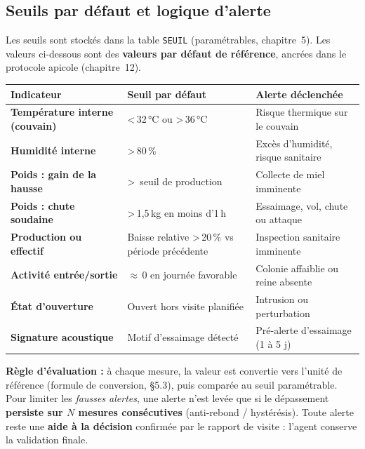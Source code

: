 \subsection{Seuils par défaut et logique d'alerte}
Les seuils sont stockés dans la table \texttt{SEUIL} (paramétrables, chapitre~5).
Les valeurs ci-dessous sont des \textbf{valeurs par défaut de référence}, ancrées
dans le protocole apicole (chapitre~12).
\begin{xltabular}{\textwidth}{>{\bfseries}p{4.4cm} X p{4.4cm}}
\toprule
\textbf{Indicateur} & \textbf{Seuil par défaut} & \textbf{Alerte déclenchée} \\
\midrule
\endhead
Température interne (couvain) & \textless\,32\,°C ou \textgreater\,36\,°C & Risque thermique sur le couvain \\
Humidité interne & \textgreater\,80\,\% & Excès d'humidité, risque sanitaire \\
Poids : gain de la hausse & \textgreater\ seuil de production & Collecte de miel imminente \\
Poids : chute soudaine & \textgreater\,1,5\,kg en moins d'1\,h & Essaimage, vol, chute ou attaque \\
Production ou effectif & Baisse relative \textgreater\,20\,\% vs période précédente & Inspection sanitaire imminente \\
Activité entrée/sortie & $\approx$\,0 en journée favorable & Colonie affaiblie ou reine absente \\
État d'ouverture & Ouvert hors visite planifiée & Intrusion ou perturbation \\
Signature acoustique & Motif d'essaimage détecté & Pré-alerte d'essaimage (1 à 5 j) \\
\bottomrule
\end{xltabular}
\begin{encadre}
\textbf{Règle d'évaluation :} à chaque mesure, la valeur est convertie vers
l'unité de référence (formule de conversion, §5.3), puis comparée au seuil
paramétrable. Pour limiter les \emph{fausses alertes}, une alerte n'est levée que
si le dépassement \textbf{persiste sur $N$ mesures consécutives} (anti-rebond /
hystérésis). Toute alerte reste une \textbf{aide à la décision} confirmée par le
rapport de visite : l'agent conserve la validation finale.
\end{encadre}

